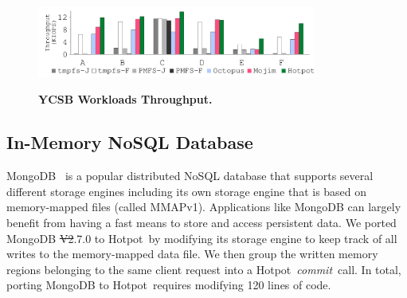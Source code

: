 \documentclass[sigconf]{acmart}
\renewcommand{\em}{\it}
\newcommand{\mycaption}[3]{\caption{\label{#1}{\bf #2} \em\small #3}}
\newcommand{\commit}{\textit{commit}}
\newcommand{\hotpot}{Hotpot}
\providecommand{\DIFadd}[1]{{\protect\color{blue}\uwave{#1}}} %
\providecommand{\DIFdel}[1]{{\protect\color{red}\sout{#1}}}                      %
\providecommand{\DIFaddbegin}{} %
\providecommand{\DIFaddend}{} %
\providecommand{\DIFdelbegin}{} %
\providecommand{\DIFdelend}{} %
\providecommand{\DIFaddbeginFL}{} %
\providecommand{\DIFaddendFL}{} %
\providecommand{\DIFdelbeginFL}{} %
\providecommand{\DIFdelendFL}{} %
\begin{document}
{{\begin{figure}[th]
\DIFdelbeginFL %
\DIFdelendFL \DIFaddbeginFL \begin{minipage}{3.6in}
\DIFaddendFL \begin{center}
\DIFdelbeginFL %
\DIFdelendFL \DIFaddbeginFL \centerline{\includegraphics[width=3.6in]{Figures/g_plot_YCSB_run_throughput.pdf}}
\mycaption{fig-ycsbrun}{YCSB Workloads Throughput.}
\DIFaddendFL {
}
\end{center}
\end{minipage}
\DIFdelbeginFL %
\DIFdelendFL \end{figure}
}

\DIFdelbegin %
\DIFdelend \DIFaddbegin \subsection{In-Memory NoSQL Database}
\label{sec:mongodb}
\DIFaddend MongoDB~\cite{MongoDB} is a popular distributed NoSQL database that supports several different storage engines
including its own storage engine that is based on memory-mapped files (called MMAPv1).
Applications like MongoDB can largely benefit from having a fast means to store and access persistent data. 
We ported MongoDB \DIFdelbegin \DIFdel{V2}\DIFdelend \DIFaddbegin \DIFadd{v2}\DIFaddend .7.0 to \hotpot\ by modifying its storage engine to keep track of all writes to the memory-mapped data file.
We then group the written memory regions belonging to the same client request into a \hotpot\ \commit\ call.
In total, porting MongoDB to \hotpot\ requires modifying 120 lines of code. 

}
\end{document}

